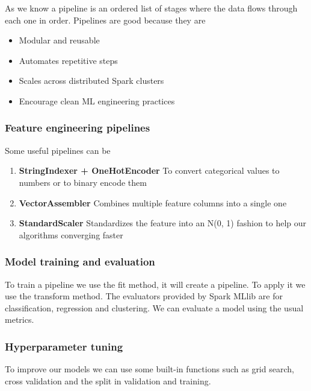\vspace{10pt}

As we know a pipeline is an ordered list of stages where the data flows through each one in order. Pipelines are good because they are

\begin{itemize}
    \item Modular and reusable
    \item Automates repetitive steps
    \item Scales across distributed Spark clusters
    \item Encourage clean ML engineering practices
\end{itemize}


\subsubsection{Feature engineering pipelines}

Some useful pipelines can be

\begin{enumerate}
    \item \textbf{StringIndexer + OneHotEncoder} \ra To convert categorical values to numbers or to binary encode them 
    \item \textbf{VectorAssembler} \ra Combines multiple feature columns into a single one
    \item \textbf{StandardScaler} \ra Standardizes the feature into an N(0, 1) fashion to help our algorithms converging faster  
\end{enumerate}


\subsubsection{Model training and evaluation}

To train a pipeline we use the fit method, it will create a pipeline. To apply it we use the transform method. The evaluators provided by Spark MLlib are for classification, regression and clustering. We can evaluate a model using the usual metrics. 


\subsubsection{Hyperparameter tuning}

To improve our models we can use some built-in functions such as grid search, cross validation and the split in validation and training. 

